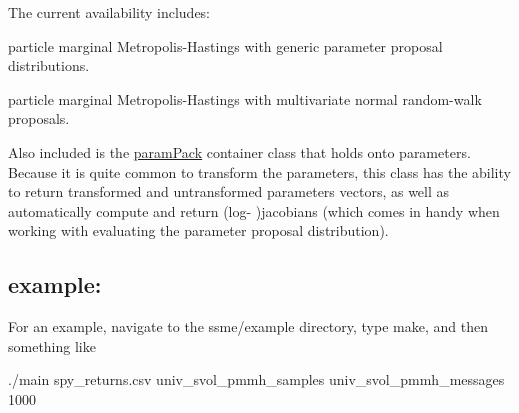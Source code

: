 \href{https://zenodo.org/badge/latestdoi/154373836}{\tt }

The current availability includes\+:


\begin{DoxyEnumerate}
\item particle marginal Metropolis-\/\+Hastings with generic parameter proposal distributions.
\item particle marginal Metropolis-\/\+Hastings with multivariate normal random-\/walk proposals.
\end{DoxyEnumerate}

Also included is the {\ttfamily \hyperlink{classparamPack}{param\+Pack}} container class that holds onto parameters. Because it is quite common to transform the parameters, this class has the ability to return transformed and untransformed parameters vectors, as well as automatically compute and return (log-\/ )jacobians (which comes in handy when working with evaluating the parameter proposal distribution).

\subsection*{example\+:}

For an example, navigate to the {\ttfamily ssme/example} directory, type {\ttfamily make}, and then something like


\begin{DoxyCode}
./main spy\_returns.csv univ\_svol\_pmmh\_samples univ\_svol\_pmmh\_messages 1000
\end{DoxyCode}
 